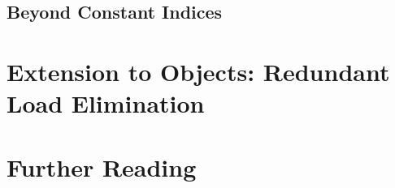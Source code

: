 
\subsection{Beyond Constant Indices}
\label{sec:non-const}



\section{Extension to Objects: Redundant Load Elimination}
\label{sec:heap}


\section{Further Reading}
\label{sec:conclusions}

